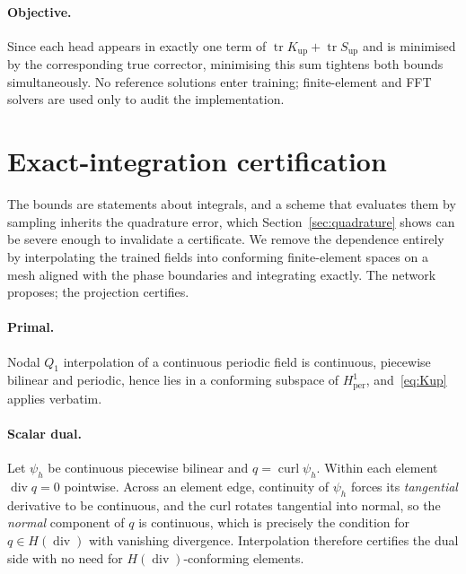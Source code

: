 \paragraph{Objective.} Since each head appears in exactly one term of
$\operatorname{tr} K_{\mathrm{up}} + \operatorname{tr} S_{\mathrm{up}}$ and
is minimised by the corresponding true corrector, minimising this sum
tightens both bounds simultaneously. No reference solutions enter training;
finite-element and FFT solvers are used only to audit the implementation.

\section{Exact-integration certification}
\label{sec:exact}

The bounds are statements about integrals, and a scheme that evaluates them
by sampling inherits the quadrature error, which Section~\ref{sec:quadrature} shows can be severe enough to invalidate a
certificate. We remove the dependence entirely by interpolating the trained
fields into conforming finite-element spaces on a mesh aligned with the
phase boundaries and integrating exactly. The network proposes; the
projection certifies.

\paragraph{Primal.} Nodal $Q_1$ interpolation of a continuous periodic
field is continuous, piecewise bilinear and periodic, hence lies in a
conforming subspace of $H^1_{\mathrm{per}}$, and~\eqref{eq:Kup} applies
verbatim.

\paragraph{Scalar dual.} Let $\psi_h$ be continuous piecewise bilinear and
$q = \operatorname{curl}\psi_h$. Within each element
$\operatorname{div} q = 0$ pointwise. Across an element edge, continuity of
$\psi_h$ forces its \emph{tangential} derivative to be continuous, and the
curl rotates tangential into normal, so the \emph{normal} component of $q$
is continuous, which is precisely the condition for $q \in H(\operatorname{div})$
with vanishing divergence. Interpolation therefore certifies the dual side
with no need for $H(\operatorname{div})$-conforming elements.

